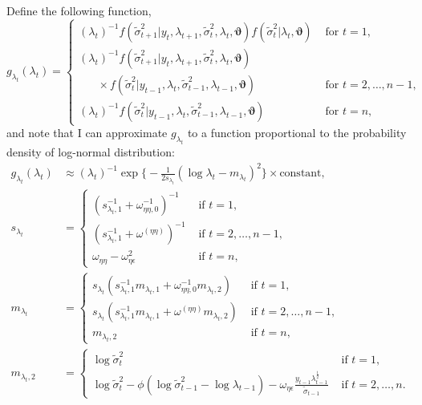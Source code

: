 \documentclass[11pt]{article}
\begin{document}
Define the following function,  
\begin{equation}
g_{\lambda_t}(\lambda_{t}) 
= \begin{cases}
(\lambda_t)^{-1} f(\widetilde{\sigma}^2_{t+1} |y_t, \lambda_{t+1}, \widetilde{\sigma}^2_{t}, \lambda_t, \bm{\vartheta}) f(\widetilde{\sigma}^2_{t} |\lambda_t, \bm{\vartheta})
& \text{ for } t=1, \\
(\lambda_t)^{-1} f(\widetilde{\sigma}^2_{t+1} |y_t, \lambda_{t+1}, \widetilde{\sigma}^2_{t}, \lambda_t, \bm{\vartheta}) \\
\hspace{20pt} \times f(\widetilde{\sigma}^2_{t} |y_{t-1}, \lambda_{t}, \widetilde{\sigma}^2_{t-1}, \lambda_{t-1}, \bm{\vartheta})
& \text{ for } t=2, \ldots, n-1, \\
(\lambda_t)^{-1} f(\widetilde{\sigma}^2_{t} |y_{t-1}, \lambda_{t}, \widetilde{\sigma}^2_{t-1}, \lambda_{t-1}, \bm{\vartheta}) 
& \text{ for } t=n, \end{cases}
\end{equation}
and note that I can approximate $g_{\lambda_t}$ to a function proportional to the probability density of log-normal distribution: 
\begin{align}
g_{\lambda_t}(\lambda_{t} ) 
&\approx (\lambda_t)^{-1} \exp \bigg\{ -\frac{1}{2s_{\lambda_t}}(\log\lambda_t -m_{\lambda_t})^2 \bigg\} \times\text{constant}, \\
s_{\lambda_t} &=\begin{cases}
(s_{\lambda_t, 1}^{-1} +\omega_{\eta\eta,0}^{-1})^{-1} & \text{ if } t=1, \\
(s_{\lambda_t, 1}^{-1} +\omega^{(\eta\eta)})^{-1} & \text{ if } t=2, \ldots, n-1, \\
\omega_{\eta\eta} -\omega_{\eta\epsilon}^2 & \text{ if } t=n, 
\end{cases} \\
m_{\lambda_t} &=\begin{cases}
s_{\lambda_t}(s_{\lambda_t, 1}^{-1}m_{\lambda_t,1}+\omega_{\eta\eta,0}^{-1}m_{\lambda_t,2}) & \text{ if } t=1, \\
s_{\lambda_t}(s_{\lambda_t, 1}^{-1}m_{\lambda_t,1}+\omega^{(\eta\eta)}m_{\lambda_t,2}) & \text{ if } t=2, \ldots, n-1, \\
m_{\lambda_t, 2} & \text{ if } t=n, 
\end{cases} \\
m_{\lambda_t, 2} &=\begin{cases}
 \log\widetilde{\sigma}^2_{t} & \text{ if } t=1, \\
 \log\widetilde{\sigma}^2_{t} -\phi (\log\widetilde{\sigma}^2_{t-1}-\log\lambda_{t-1}) -\omega_{\eta\epsilon} \frac{y_{t-1}\lambda_{t-1}^{\frac{1}{2}}}{\widetilde{\sigma}_{t-1}} & \text{ if } t=2, \ldots, n. 
 \end{cases}
\end{align}
\end{document}

